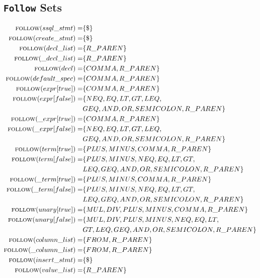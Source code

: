 \documentclass{article}
\begin{document}
\subsection{\texttt{Follow} Sets}
\begin{align*}
\textsc{follow}(ssql\_stmt) =& \{\$\} \\
\textsc{follow}(create\_stmt) =& \{\$\} \\
\textsc{follow}(decl\_list) =& \{R\_PAREN\} \\
\textsc{follow}(\_decl\_list) =& \{R\_PAREN\} \\
\textsc{follow}(decl) =& \{COMMA, R\_PAREN\} \\
\textsc{follow}(default\_spec) =& \{COMMA, R\_PAREN\} \\
\textsc{follow}(expr[true]) =& \{COMMA, R\_PAREN\} \\
\textsc{follow}(expr[false]) =& \{NEQ, EQ, LT, GT, LEQ,\\
 & GEQ, AND, OR, SEMICOLON, R\_PAREN\} \\
\textsc{follow}(\_expr[true]) =& \{COMMA, R\_PAREN\} \\
\textsc{follow}(\_expr[false]) =& \{NEQ, EQ, LT, GT, LEQ,\\
& GEQ, AND, OR, SEMICOLON, R\_PAREN\} \\
\textsc{follow}(term[true]) =& \{PLUS, MINUS, COMMA, R\_PAREN\} \\
\textsc{follow}(term[false]) =& \{PLUS, MINUS, NEQ, EQ, LT, GT,\\
& LEQ, GEQ, AND, OR, SEMICOLON, R\_PAREN\} \\
\textsc{follow}(\_term[true]) =& \{PLUS, MINUS, COMMA, R\_PAREN\} \\
\textsc{follow}(\_term[false]) =& \{PLUS, MINUS, NEQ, EQ, LT, GT,\\
& LEQ, GEQ, AND, OR, SEMICOLON, R\_PAREN\} \\
\textsc{follow}(unary[true]) =& \{MUL, DIV, PLUS, MINUS, COMMA, R\_PAREN\} \\
\textsc{follow}(unary[false]) =& \{MUL, DIV, PLUS, MINUS, NEQ, EQ, LT,\\
& GT, LEQ, GEQ, AND, OR, SEMICOLON, R\_PAREN\} \\
\textsc{follow}(column\_list) =& \{FROM, R\_PAREN\} \\
\textsc{follow}(\_column\_list) =& \{FROM, R\_PAREN\} \\
\textsc{follow}(insert\_stmt) =& \{\$\} \\
\textsc{follow}(value\_list) =& \{R\_PAREN\} \\

\end{align*}
\end{document}
